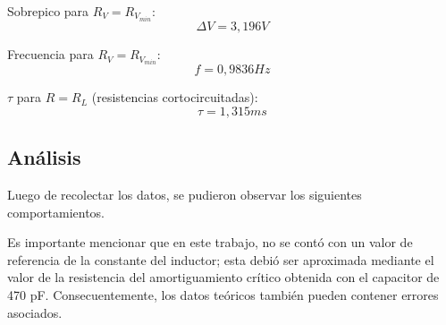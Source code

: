 \documentclass{article}
\begin{document}
                Sobrepico para $ R_V = R_{V_{min}} $:
                \begin{equation*}
                    \Delta V = 3,196 V
                \end{equation*} \par

                Frecuencia para $ R_V = R_{V_{min}} $:
                \begin{equation*}
                    f = 0,9836 Hz
                \end{equation*} \par

                $ \tau $ para $ R = R_L $ (resistencias cortocircuitadas):
                \begin{equation*}
                    \tau =  1,315 ms 
                \end{equation*}
        


    \subsection{Análisis}
    
    	Luego de recolectar los datos, se pudieron observar los siguientes comportamientos. \par
	Es importante mencionar que en este trabajo, no se contó con un valor de referencia de la constante del inductor; esta debió ser aproximada mediante el valor de la resistencia del amortiguamiento crítico obtenida con el capacitor de 470 pF. Consecuentemente, los datos teóricos también pueden contener errores asociados.
	
\end{document}
